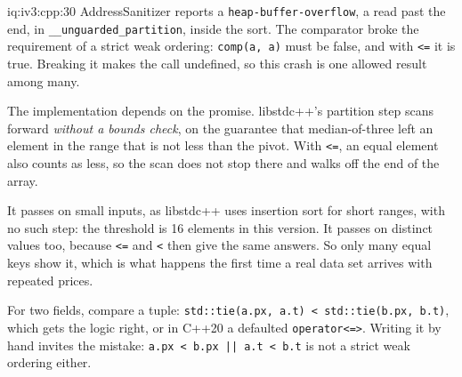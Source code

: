 \begin{solution}{iq:iv3:cpp:30}
AddressSanitizer reports a \texttt{heap-buffer-overflow}, a read past the end, in \texttt{\_\_unguarded\_partition}, inside the sort. The comparator broke the requirement of a strict weak ordering: \texttt{comp(a, a)} must be false, and with \texttt{<=} it is true. Breaking it makes the call undefined, so this crash is one allowed result among many.

The implementation depends on the promise. libstdc++'s partition step scans forward \emph{without a bounds check}, on the guarantee that median-of-three left an element in the range that is not less than the pivot. With \texttt{<=}, an equal element also counts as less, so the scan does not stop there and walks off the end of the array.

It passes on small inputs, as libstdc++ uses insertion sort for short ranges, with no such step: the threshold is 16 elements in this version. It passes on distinct values too, because \texttt{<=} and \texttt{<} then give the same answers. So only many equal keys show it, which is what happens the first time a real data set arrives with repeated prices.

For two fields, compare a tuple: \texttt{std::tie(a.px, a.t) < std::tie(b.px, b.t)}, which gets the logic right, or in C++20 a defaulted \texttt{operator<=>}. Writing it by hand invites the mistake: \texttt{a.px < b.px || a.t < b.t} is not a strict weak ordering either.

\end{solution}

